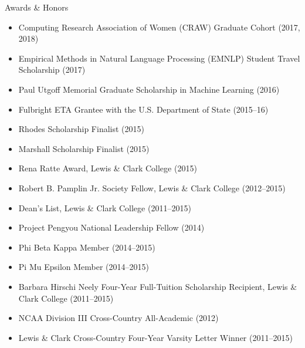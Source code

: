 \documentclass{resume} %
\newcommand\blfootnote[1]{%
  \begingroup
  \renewcommand\thefootnote{}\footnote{#1}%
  \addtocounter{footnote}{-1}%
  \endgroup
}
\begin{document}
\begin{rSection}{Awards \& Honors}
\begin{itemize}
\item Computing Research Association of Women (CRAW) Graduate Cohort (2017, 2018) 
\item Empirical Methods in Natural Language Processing (EMNLP) Student Travel Scholarship (2017)
\item Paul Utgoff Memorial Graduate Scholarship in Machine Learning (2016) 
\item Fulbright ETA Grantee with the U.S. Department of State (2015--16)
\item Rhodes Scholarship Finalist (2015) 
\item Marshall Scholarship Finalist (2015) 
\item Rena Ratte Award, Lewis \& Clark College (2015) 
\item Robert B. Pamplin Jr. Society Fellow, Lewis \& Clark College (2012--2015)
\item Dean's List, Lewis \& Clark College (2011--2015)
\item Project Pengyou National Leadership Fellow (2014) 
\item Phi Beta Kappa Member (2014--2015)
\item Pi Mu Epsilon Member (2014--2015)
\item Barbara Hirschi Neely Four-Year Full-Tuition Scholarship Recipient, Lewis \& Clark College (2011--2015)
\item NCAA Division III Cross-Country All-Academic (2012) 
\item Lewis \& Clark Cross-Country Four-Year Varsity Letter Winner (2011--2015)
\end{itemize} 
\end{rSection}
\end{document}
